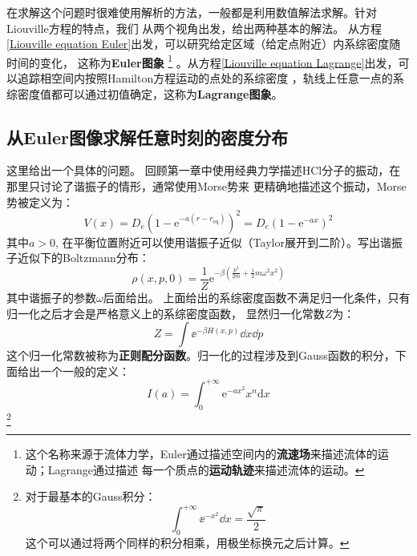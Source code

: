     在求解这个问题时很难使用解析的方法，一般都是利用数值解法求解。针对Liouville方程的特点，我们
    从两个视角出发，给出两种基本的解法。
    从方程\ref{Liouville equation Euler}出发，可以研究给定区域（给定点附近）内系综密度随时间的变化，
    这称为\textbf{Euler图象}
    \footnote{这个名称来源于流体力学，Euler通过描述空间内的\textbf{流速场}来描述流体的运动；Lagrange通过描述
    每一个质点的\textbf{运动轨迹}来描述流体的运动。}
    。从方程\ref{Liouville equation Lagrange}出发，可以追踪相空间内按照Hamilton方程运动的点处的系综密度
    ，轨线上任意一点的系综密度值都可以通过初值确定，这称为\textbf{Lagrange图象}。

    \subsection{从Euler图像求解任意时刻的密度分布}
    这里给出一个具体的问题。
    回顾第一章中使用经典力学描述HCl分子的振动，在那里只讨论了谐振子的情形，通常使用Morse势来
    更精确地描述这个振动，Morse势被定义为：
    \begin{equation}
        V(x) = D_e (1- \mathrm{e}^{-a(r-r_\mathrm{eq})})^2 = D_e(1-\mathrm{e}^{-ax})^2
    \end{equation}
    其中$a>0$, 在平衡位置附近可以使用谐振子近似（Taylor展开到二阶）。写出谐振子近似下的Boltzmann分布：
    \begin{equation}
        \rho(x,p,0) = \frac {1}{Z} \mathrm{e}^{-\beta (\frac {p^2}{2m} + \frac 12 m\omega^2 x^2)} 
    \end{equation}
    其中谐振子的参数$\omega$后面给出。
    上面给出的系综密度函数不满足归一化条件，只有归一化之后才会是严格意义上的系综密度函数，
    显然归一化常数$Z$为：
    \begin{equation}
        Z = \int\ee^{-\beta H(x, p)}\dd x\dd p
    \end{equation}
    这个归一化常数被称为\textbf{正则配分函数}。归一化的过程涉及到Gauss函数的积分，下面给出一个一般的定义：
    \begin{equation}
        I(a) = \int_0^{+\infty} \mathrm{e}^{-ax^2} x^{n} \mathrm{d}x
        \label{1_D Gauss integral}
    \end{equation}
    \footnote{
        对于最基本的Gauss积分：
        \begin{equation}
            \int_{0}^{+\infty}\ee^{-x^2}\dd x = \frac{\sqrt{\pi}}{2}
        \end{equation}
        这个可以通过将两个同样的积分相乘，用极坐标换元之后计算。
    }

